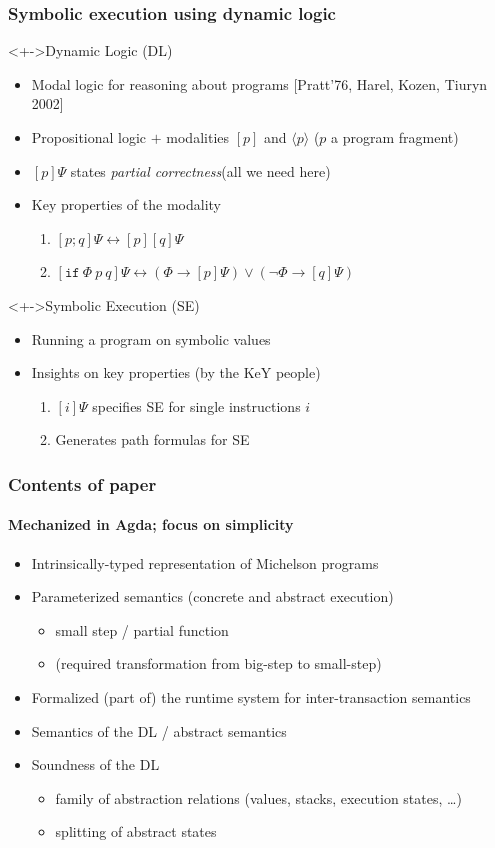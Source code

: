 \documentclass[aspectratio=1610]{beamer}
\begin{document}
\begin{frame}
  \frametitle{Symbolic execution using dynamic logic}
  \begin{block}<+->{Dynamic Logic (DL)}
  \begin{itemize}[<+->]
  \item Modal logic for reasoning about programs [Pratt'76, Harel, Kozen, Tiuryn 2002]
  \item Propositional logic $+$ modalities $[p]$ and $\langle p\rangle$ \hfill ($p$ a program fragment)
  \item $[p]\Psi$ states \emph{partial correctness}\hfill (all we need here)
  \item Key properties of the modality
    \begin{enumerate}
    \item $[p;q]\Psi \leftrightarrow [p][q]\Psi$
    \item $[\mathtt{if}~\Phi~p~q]\Psi \leftrightarrow (\Phi \to [p]\Psi) \vee (\neg\Phi \to [q]\Psi)$
  \end{enumerate}
  \end{itemize}
\end{block}
\begin{block}<+->{Symbolic Execution (SE)}
  \begin{itemize}[<+->]
  \item Running a program on symbolic values
  \item Insights on key properties (by the KeY people)
    \begin{enumerate}
    \item $[i]\Psi$ specifies SE for single instructions $i$
    \item Generates path formulas for SE
  \end{enumerate}
  \end{itemize}
\end{block}
\end{frame}
\begin{frame}
  \frametitle{Contents of paper}
  \framesubtitle{Mechanized in Agda; focus on simplicity}
  \begin{itemize}
  \item Intrinsically-typed representation of Michelson programs
  \item Parameterized semantics (concrete and abstract execution)
    \begin{itemize}
    \item small step / partial function
    \item (required transformation from big-step to small-step)
    \end{itemize}
  \item Formalized (part of) the runtime system for inter-transaction semantics
  \item Semantics of the DL / abstract semantics
  \item Soundness of the DL
    \begin{itemize}
    \item family of abstraction relations (values, stacks, execution states, \dots)
    \item splitting of abstract states
  \end{itemize}
  \end{itemize}
\end{frame}
\end{document}
